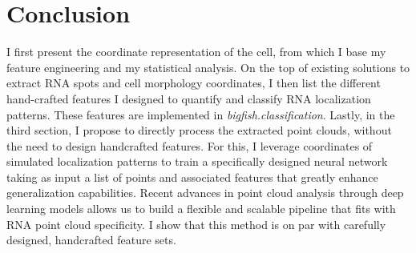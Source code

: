 \section{Conclusion}
\label{sec:analysis_conclusion}

I first present the coordinate representation of the cell, from which I base my feature engineering and my statistical analysis.
On the top of existing solutions to extract \ac{RNA} spots and cell morphology coordinates, I then list the different hand-crafted features I designed to quantify and classify \ac{RNA} localization patterns.
These features are implemented in \emph{bigfish.classification}.
Lastly, in the third section, I propose to directly process the extracted point clouds, without the need to design handcrafted features.
For this, I leverage coordinates of simulated localization patterns to train a specifically designed neural network taking as input a list of points and associated features that greatly enhance generalization capabilities.
Recent advances in point cloud analysis through deep learning models allows us to build a flexible and scalable pipeline that fits with \ac{RNA} point cloud specificity.
I show that this method is on par with carefully designed, handcrafted feature sets.

